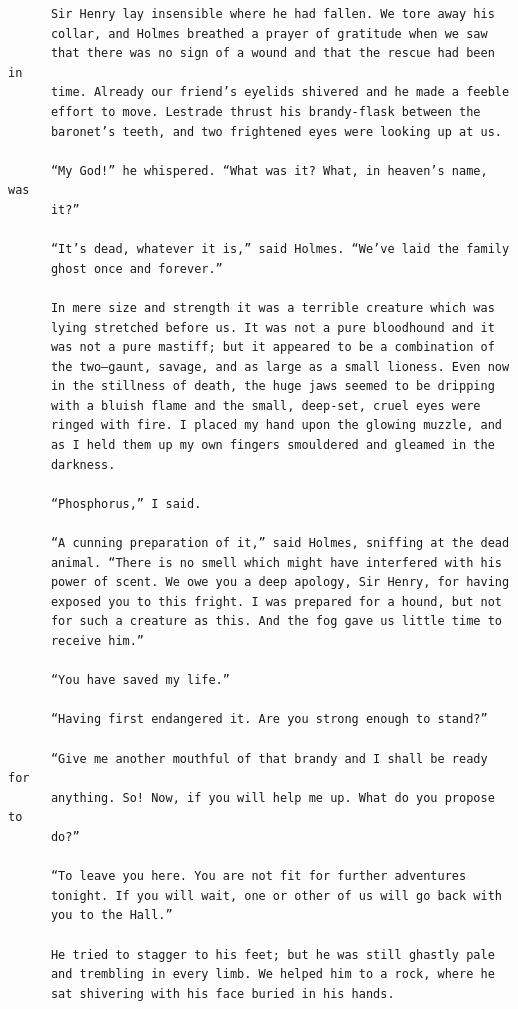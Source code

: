 \documentclass{article}
\begin{document}
\begin{verbatim}
      Sir Henry lay insensible where he had fallen. We tore away his
      collar, and Holmes breathed a prayer of gratitude when we saw
      that there was no sign of a wound and that the rescue had been in
      time. Already our friend’s eyelids shivered and he made a feeble
      effort to move. Lestrade thrust his brandy-flask between the
      baronet’s teeth, and two frightened eyes were looking up at us.

      “My God!” he whispered. “What was it? What, in heaven’s name, was
      it?”

      “It’s dead, whatever it is,” said Holmes. “We’ve laid the family
      ghost once and forever.”

      In mere size and strength it was a terrible creature which was
      lying stretched before us. It was not a pure bloodhound and it
      was not a pure mastiff; but it appeared to be a combination of
      the two—gaunt, savage, and as large as a small lioness. Even now
      in the stillness of death, the huge jaws seemed to be dripping
      with a bluish flame and the small, deep-set, cruel eyes were
      ringed with fire. I placed my hand upon the glowing muzzle, and
      as I held them up my own fingers smouldered and gleamed in the
      darkness.

      “Phosphorus,” I said.

      “A cunning preparation of it,” said Holmes, sniffing at the dead
      animal. “There is no smell which might have interfered with his
      power of scent. We owe you a deep apology, Sir Henry, for having
      exposed you to this fright. I was prepared for a hound, but not
      for such a creature as this. And the fog gave us little time to
      receive him.”

      “You have saved my life.”

      “Having first endangered it. Are you strong enough to stand?”

      “Give me another mouthful of that brandy and I shall be ready for
      anything. So! Now, if you will help me up. What do you propose to
      do?”

      “To leave you here. You are not fit for further adventures
      tonight. If you will wait, one or other of us will go back with
      you to the Hall.”

      He tried to stagger to his feet; but he was still ghastly pale
      and trembling in every limb. We helped him to a rock, where he
      sat shivering with his face buried in his hands.


\end{verbatim}
\end{document}
